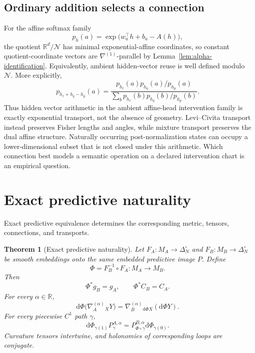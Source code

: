 \documentclass[11pt]{article}
\newtheorem{theorem}{Theorem}[section]
\theoremstyle{definition}
\theoremstyle{remark}
\newcommand{\simplex}{\Delta_{N}^{\circ}}
\newcommand{\R}{\mathbb{R}}
\newcommand{\dd}{\mathrm{d}}
\begin{document}
\subsection{Ordinary addition selects a connection}

For the affine softmax family
\begin{equation}
    p_h(a)=\exp\bigl(w_a^\top h+b_a-A(h)\bigr),
\end{equation}
the quotient $\R^d/\mathcal N$ has minimal exponential-affine coordinates, so
constant quotient-coordinate vectors are $\nabla^{(1)}$-parallel by
Lemma~\ref{lem:alpha-identification}. Equivalently, ambient hidden-vector reuse
is well defined modulo $\mathcal N$. More explicitly,
\begin{equation}
    p_{h_r+h_q-h_p}(a)
    =\frac{p_{h_r}(a)p_{h_q}(a)/p_{h_p}(a)}
    {\sum_b p_{h_r}(b)p_{h_q}(b)/p_{h_p}(b)}.
    \label{eq:e-analogy}
\end{equation}
Thus hidden vector arithmetic in the ambient affine-head intervention family is exactly exponential transport, not the absence of geometry. Levi--Civita transport instead preserves Fisher lengths and angles, while mixture transport preserves the dual affine structure. Naturally occurring post-normalization states can occupy a lower-dimensional subset that is not closed under this arithmetic. Which connection best models a semantic operation on a declared intervention chart is an empirical question.

\section{Exact predictive naturality}

Exact predictive equivalence determines the corresponding metric, tensors, connections, and transports.

\begin{theorem}[Exact predictive naturality]\label{thm:exact-naturality}
Let $F_A:M_A\to\simplex$ and $F_B:M_B\to\simplex$ be smooth embeddings onto the same embedded predictive image $P$. Define
\begin{equation}
    \Phi=F_B^{-1}\circ F_A:M_A\longrightarrow M_B.
\end{equation}
Then
\begin{equation}
    \Phi^*g_B=g_A,\qquad \Phi^*C_B=C_A.
\end{equation}
For every $\alpha\in\R$,
\begin{equation}
    \dd\Phi\bigl(\nabla_A^{(\alpha)}{}_X Y\bigr)
    =\nabla_B^{(\alpha)}{}_{\dd\Phi X}(\dd\Phi Y).
    \label{eq:connection-naturality}
\end{equation}
For every piecewise $C^1$ path $\gamma$,
\begin{equation}
    \dd\Phi_{\gamma(1)}P_\gamma^{A,\alpha}
    =P_{\Phi\circ\gamma}^{B,\alpha}\dd\Phi_{\gamma(0)}.
    \label{eq:transport-naturality}
\end{equation}
Curvature tensors intertwine, and holonomies of corresponding loops are conjugate.
\end{theorem}
\end{document}

